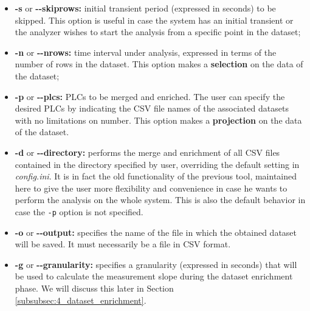 \begin{itemize}
	\item \textbf{-s} or \textbf{{-}{-}skiprows:} initial transient period (expressed in seconds) to be skipped. This option is useful in case the system has an initial transient or the analyzer wishes to start the analysis from a specific point in the dataset;
	
	\item \textbf{-n} or \textbf{{-}{-}nrows:} time interval under analysis, expressed in terms of the number of rows in the dataset.\newline
	This option makes a \textbf{selection} on the data of the dataset;
	
	\item \textbf{-p} or \textbf{{-}{-}plcs:} PLCs to be merged and enriched. The user can specify the desired PLCs by indicating the CSV file names of the associated datasets with no limitations on number.\newline
	This option makes a \textbf{projection} on the data of the dataset.
	
	\item \textbf{-d} or \textbf{{-}{-}directory:} performs the merge and enrichment of all CSV files contained in the directory specified by user, overriding the default setting in \textit{config.ini}. It is in fact the old functionality of the previous tool, maintained here to give the user more flexibility and convenience in case he wants to perform the analysis on the whole system. This is also the default behavior in case the \texttt{-p} option is not specified.
	
	\item \textbf{-o} or \textbf{{-}{-}output:} specifies the name of the file in which the obtained dataset will be saved. It must necessarily be a file in CSV format.
	
	\item \textbf{-g} or \textbf{{-}{-}granularity:} specifies a granularity (expressed in seconds) that will be used to calculate the measurement slope during the dataset enrichment phase. We will discuss this later in Section \ref{subsubsec:4_dataset_enrichment}.
\end{itemize}

